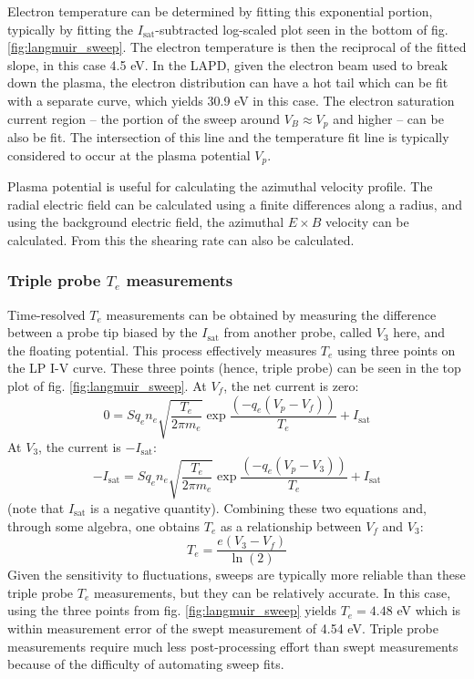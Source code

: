 Electron temperature can be determined by fitting this exponential portion, typically by fitting the $I_\text{sat}$-subtracted log-scaled plot seen in the bottom of fig. \ref{fig:langmuir_sweep}. The electron temperature is then the reciprocal of the fitted slope, in this case 4.5 eV. In the LAPD, given the electron beam used to break down the plasma, the electron distribution can have a hot tail which can be fit with a separate curve, which yields 30.9 eV in this case. The electron saturation current region -- the portion of the sweep around $V_B \approx V_p$ and higher -- can be also be fit. The intersection of this line and the temperature fit line is typically considered to occur at the plasma potential $V_p$. 

Plasma potential is useful for calculating the azimuthal velocity profile. The radial electric field can be calculated using a finite differences along a radius, and using the background electric field, the azimuthal $E \times B$ velocity can be calculated. From this the shearing rate can also be calculated.

\subsubsection{Triple probe $T_e$ measurements}
Time-resolved $T_e$ measurements can be obtained by measuring the difference between a probe tip biased by the $I_\text{sat}$ from another probe, called $V_3$ here, and the floating potential. This process effectively measures $T_e$ using three points on the LP I-V curve. These three points (hence, triple probe) can be seen in the top plot of fig. \ref{fig:langmuir_sweep}. At $V_f$, the net current is zero: 
\begin{equation}
	0 = S q_e n_e \sqrt{\frac{T_e}{2 \pi m_e}} \exp \frac{(- q_e (V_p - V_f))}{T_e} + I_\text{sat}
\end{equation}
At $V_3$, the current is $- I_\text{sat}$:
\begin{equation}
	-I_\text{sat} = S q_e n_e \sqrt{\frac{T_e}{2 \pi m_e}} \exp \frac{(- q_e (V_p - V_3))}{T_e} + I_\text{sat}
\end{equation}
(note that $I_\text{sat}$ is a negative quantity).
Combining these two equations and, through some algebra, one obtains $T_e$ as a relationship between $V_f$ and $V_3$:
\begin{equation}
	T_e = \frac{e (V_3 - V_f)}{\ln(2)}
\end{equation}
Given the sensitivity to fluctuations, sweeps are typically more reliable than these triple probe $T_e$ measurements, but they can be relatively accurate. In this case, using the three points from fig. \ref{fig:langmuir_sweep} yields $T_e = 4.48$ eV which is within measurement error of the swept measurement of 4.54 eV. Triple probe measurements require much less post-processing effort than swept measurements because of the difficulty of automating sweep fits. 

